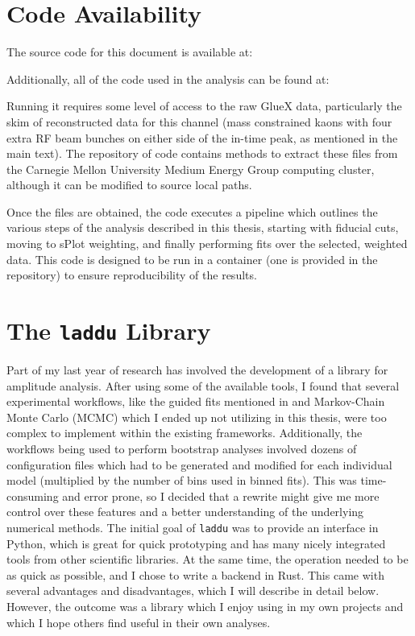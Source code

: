 \section{Code Availability}\label{sec:code-availability}
The source code for this document is available at:

\begin{center}
\end{center}

Additionally, all of the code used in the analysis can be found at:

\begin{center}
\end{center}

Running it requires some level of access to the raw GlueX data, particularly the skim of reconstructed data for this channel (mass constrained kaons with four extra RF beam bunches on either side of the in-time peak, as mentioned in the main text). The repository of code contains methods to extract these files from the Carnegie Mellon University Medium Energy Group computing cluster, although it can be modified to source local paths.

Once the files are obtained, the code executes a pipeline which outlines the various steps of the analysis described in this thesis, starting with fiducial cuts, moving to sPlot weighting, and finally performing fits over the selected, weighted data. This code is designed to be run in a container (one is provided in the repository) to ensure reproducibility of the results.

\section{The \texttt{laddu} Library}\label{sec:the-laddu-library}
Part of my last year of research has involved the development of a library for amplitude analysis. After using some of the available tools, I found that several experimental workflows, like the guided fits mentioned in  and Markov-Chain Monte Carlo (MCMC) which I ended up not utilizing in this thesis, were too complex to implement within the existing frameworks. Additionally, the workflows being used to perform bootstrap analyses involved dozens of configuration files which had to be generated and modified for each individual model (multiplied by the number of bins used in binned fits). This was time-consuming and error prone, so I decided that a rewrite might give me more control over these features and a better understanding of the underlying numerical methods. The initial goal of \texttt{laddu} was to provide an interface in Python, which is great for quick prototyping and has many nicely integrated tools from other scientific libraries. At the same time, the operation needed to be as quick as possible, and I chose to write a backend in Rust. This came with several advantages and disadvantages, which I will describe in detail below. However, the outcome was a library which I enjoy using in my own projects and which I hope others find useful in their own analyses.

